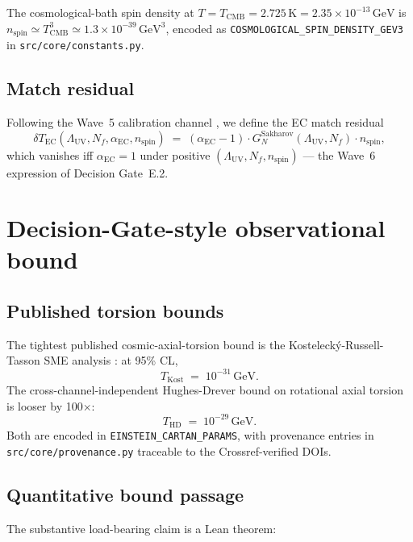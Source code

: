 \documentclass[twocolumn]{revtex4-2}
\newcommand{\Nf}{N_f}
\newcommand{\LambdaUV}{\Lambda_{\mathrm{UV}}}
\newcommand{\aEC}{\alpha_{\mathrm{EC}}}
\newcommand{\GNsak}{G_{N}^{\mathrm{Sakharov}}}
\newcommand{\TEC}{T_{\mathrm{EC}}}
\newcommand{\nspin}{n_{\mathrm{spin}}}
\newcommand{\TKost}{T_{\mathrm{Kost}}}
\newcommand{\THD}{T_{\mathrm{HD}}}
\begin{document}
The cosmological-bath spin density at $T = T_{\mathrm{CMB}} =
2.725\,\mathrm{K} = 2.35\times 10^{-13}\,\mathrm{GeV}$ is
$\nspin \simeq T_{\mathrm{CMB}}^{3} \simeq 1.3\times 10^{-39}\,
\mathrm{GeV}^{3}$, encoded as
\texttt{COSMOLOGICAL\_SPIN\_DENSITY\_GEV3} in
\texttt{src/core/constants.py}.

\subsection{Match residual}

Following the Wave~5 calibration channel \cite{Roehm2026Wave5},
we define the EC match residual
\begin{equation}
  \delta\TEC(\LambdaUV,\Nf,\aEC,\nspin) \;=\;
    (\aEC - 1)\cdot\GNsak(\LambdaUV,\Nf)\cdot\nspin,
  \label{eq:dTEC}
\end{equation}
which vanishes iff $\aEC = 1$ under positive
$(\LambdaUV,\Nf,\nspin)$ --- the Wave~6 expression of Decision
Gate~E.2.

\section{Decision-Gate-style observational bound}

\subsection{Published torsion bounds}

The tightest published cosmic-axial-torsion bound is the
Kostelecký-Russell-Tasson SME analysis
\cite{KosteleckyRussellTasson2008}: at 95\% CL,
\begin{equation}
  \TKost \;=\; 10^{-31}\,\mathrm{GeV}.
\end{equation}
The cross-channel-independent Hughes-Drever bound
\cite{Lammerzahl2001} on rotational axial torsion is looser by 100$\times$:
\begin{equation}
  \THD \;=\; 10^{-29}\,\mathrm{GeV}.
\end{equation}
Both are encoded in \texttt{EINSTEIN\_CARTAN\_PARAMS}, with
provenance entries in \texttt{src/core/provenance.py} traceable to
the Crossref-verified DOIs.

\subsection{Quantitative bound passage}

The substantive load-bearing claim is a Lean theorem:
\end{document}
